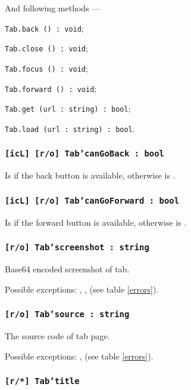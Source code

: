 And following methods —
\begin{icItems}
	\item \texttt{Tab.back () : void};
	\item \texttt{Tab.close () : void};
	\item \texttt{Tab.focus () : void};
	\item \texttt{Tab.forward () : void};
	\item \texttt{Tab.get (url : string) : bool};
	\item \texttt{Tab.load (url : string) : bool}.
\end{icItems}

\subsubsection{\texttt{[icL] [r/o] Tab'canGoBack : bool}}

Is \true{} if the back button is available, otherwise is \false.

\subsubsection{\texttt{[icL] [r/o] Tab'canGoForward : bool}}

Is \true{} if the forward button is available, otherwise is \false.

\subsubsection{\texttt{[r/o] Tab'screenshot : string}}

Base64 encoded screenshot of tab.

Possible exceptions: , ,  (see table \ref{errors}).

\subsubsection{\texttt{[r/o] Tab'source : string}}

The source code of tab page.

Possible exceptions: ,  (see table \ref{errors}).

\subsubsection{\texttt{[r/*] Tab'title}}

